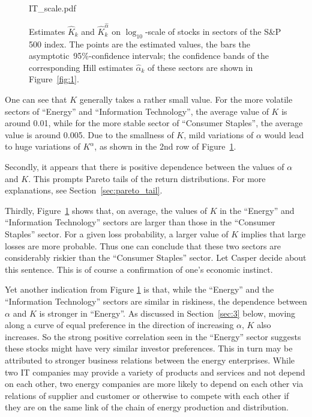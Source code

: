 \documentclass[11pt,a4]{amsart}
\newcommand{\red}{\color{darkred}}
\newcommand{\asy}{asymptotic}
\newcommand{\pro}{probabilit}
\newcommand{\1}{{\mathbf 1}}
\begin{document}
\begin{figure}[htb!]
\begin{minipage}{0.33\linewidth}
    {IT_scale.pdf}
  \end{minipage}
  \caption{\small Estimates $\hat K_k$ and $\hat K_k^{\hat \alpha}$ on $\log_{10}$-scale 
of stocks in sectors
    of the S\&P 500 index. The points are the estimated values, the bars 
    the \asy\ 95\%-confidence intervals; the confidence bands of the
    corresponding Hill estimates $\hat \alpha_k$ of these sectors are
    shown in Figure~\ref{fig:1}. 
  }
  \label{fig:sectors_parameters}
\end{figure}
One can see that $K$ generally takes a rather small value. For the
more volatile sectors of ``Energy'' and ``Information Technology'',
the average value of $K$ is around 0.01, while for the more stable
sector of ``Consumer Staples'', the average value is around 0.005. Due
to the smallness of $K$, mild variations of $\alpha$ would lead to
huge variations of $K^\alpha$, as shown in the 2nd row of
Figure~\ref{fig:sectors_parameters}.
\par
Secondly, it appears that there is positive dependence between the  values of $\alpha$ and $K$. 
This prompts Pareto tails of the return
distributions. For more explanations, see
Section~\ref{sec:pareto_tail}.
\par
Thirdly, Figure~\ref{fig:sectors_parameters} shows that, on
average, the values of $K$
in the ``Energy'' and ``Information Technology'' sectors are  larger than those in the ``Consumer Staples'' sector. 
For a given loss \pro y, 
a larger
value of $K$ implies that large losses are more probable. Thus one can conclude that
these two sectors are considerably riskier than the ``Consumer
Staples'' sector. {\red Let Casper decide about this sentence.} This is of course a confirmation of one's economic
instinct.
\par
Yet another indication from Figure \ref{fig:sectors_parameters} is
that, while the ``Energy'' and the ``Information Technology'' sectors
are similar in riskiness, the dependence  between $\alpha$ and $K$ is
stronger in ``Energy''. As discussed in Section~\ref{sec:3} below, moving along
a curve of equal preference in the direction of increasing $\alpha$, $K$ also
increases. So the strong positive correlation seen in the ``Energy''
sector suggests these stocks might have very similar investor
preferences. This in turn may be attributed to stronger business
relations between the energy enterprises. While two IT companies
may provide a variety of products and services and not depend on each
other, two energy companies are more likely to depend on each other
via relations of supplier and customer or otherwise to compete with each
other if they are on the same link of the chain of energy production
and distribution.
\end{document}
